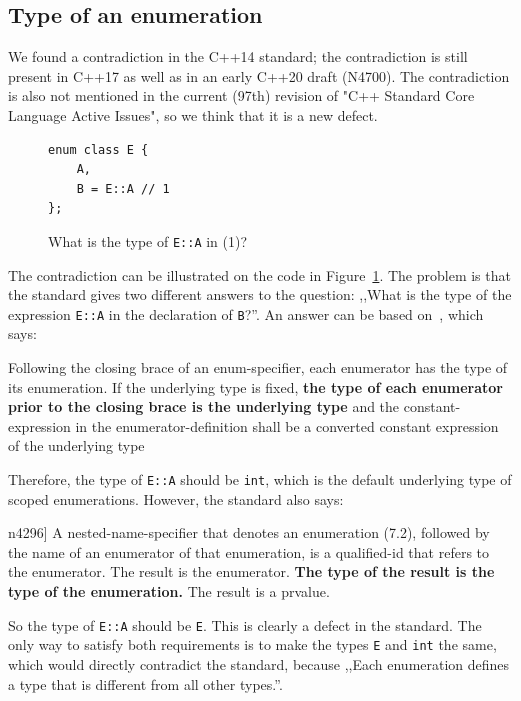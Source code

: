 \documentclass[nolot,nolof,nocover,printed]{fithesis3}
\newcommand{\stdN}[2]{\cite[#2]{#1}\xspace}
\begin{document}
\subsection{Type of an enumeration}

We found a contradiction in the C++14 standard; the contradiction is still present in C++17 as well as in an early C++20 draft (N4700).
The contradiction is also not mentioned in the current (97th) revision of "C++ Standard Core Language Active Issues", so we think that it is a new defect.

\begin{figure}[ht]
\begin{lstlisting}
enum class E {
    A,
    B = E::A // 1
};
\end{lstlisting}
\caption{What is the type of \lstinline|E::A| in (1)?}
\label{fig:typeOfAQualifiedEnumerator}
\end{figure}

The contradiction can be illustrated on the code in Figure~\ref{fig:typeOfAQualifiedEnumerator}. The problem is that the standard gives two different answers to the question: ,,What is the type of the expression \lstinline|E::A| in the declaration of \texttt{B}?''. An answer can be based on~\stdN{n4296}{\S 7.2/5}, which says:
\begin{displayquote}
\textelp{} Following the closing brace of an enum-specifier, each enumerator has the type of its enumeration. If the underlying type is fixed, \textbf{the type of each enumerator prior to the closing brace is the underlying type} and the constant-expression in the enumerator-definition shall be a converted constant expression of the underlying type \textelp{}
\end{displayquote}
Therefore, the type of \lstinline|E::A| should be \texttt{int}, which is the default underlying type of scoped enumerations. However, the standard also says:
\begin{displayquote}[\stdN{n4296}{\S 5.1.1/11}]
A nested-name-specifier that denotes an enumeration (7.2), followed by the name of an enumerator of that enumeration, is a qualified-id that refers to the enumerator. The result is the enumerator. \textbf{The type of the result is the type of the enumeration.} The result is a prvalue.
\end{displayquote}
So the type of \lstinline|E::A| should be \texttt{E}. This is clearly a defect in the standard. The only way to satisfy both requirements is to make the types \texttt{E} and \texttt{int} the same, which would directly contradict the standard, because ,,Each enumeration defines a type that is different from all other types.''\stdN{n4296}{\S 7.2/5}.
\end{document}

